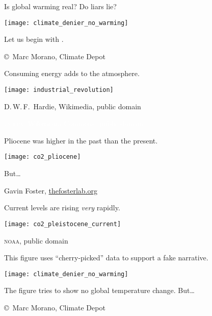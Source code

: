 \documentclass[t]{beamer}
\begin{document}
%
\begin{frame}[t]{Is global warming real? Do liars lie?}
	\begin{center}
		\texttt{[image: climate\_denier\_no\_warming]}
	\end{center}

	Let us begin with .
	
	\vfilll
	
	\hfill \tiny \copyright~Marc Morano, Climate Depot
\end{frame}

%


%
\begin{frame}[t]{Consuming energy adds  to the atmosphere.}

	\texttt{[image: industrial\_revolution]}

	\vfilll
	
	\hfill \tiny D.\,W.\,F.~Hardie, Wikimedia, public domain

\end{frame}
%
{
\begin{frame}[b]

	\hfill \tiny \textcolor{white}{\textsc{us epa}, Wikimedia Commons, public domain}
\end{frame}
}
%
\begin{frame}{Pliocene  was higher in the past than the present.}
	
	\texttt{[image: co2\_pliocene]}\par
	
	\hangpara But\dots
	
	\vfilll
	
	\hfill \tiny Gavin Foster, \href{http://www.thefosterlab.org/blog/2015/11/11/is-this-the-last-year-below-400-ppm}{thefosterlab.org}
\end{frame}
%
\begin{frame}{Current  levels are rising \emph{very} rapidly.}
	
	{\centering
		\texttt{[image: co2\_pleistocene\_current]}\par
	}
	
	\vfilll
	
	\hfill \tiny \textsc{noaa}, public domain
\end{frame}
%
\begin{frame}[t]{This figure uses “cherry-picked” data to support a fake narrative.}
	
	{\centering
		\texttt{[image: climate\_denier\_no\_warming]}\par
	}
	
	The figure tries to show no global temperature change. But\dots
	
	\vfilll
	
	\hfill \tiny \copyright~Marc Morano, Climate Depot
\end{frame}
\end{document}
